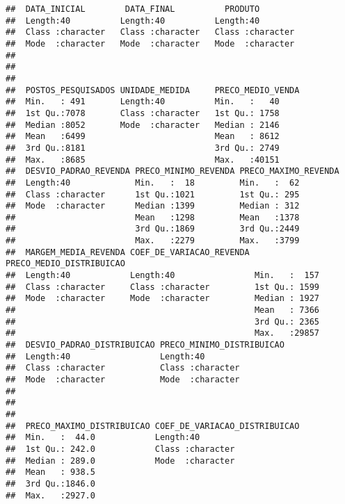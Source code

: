 \documentclass[]{article}
\begin{document}
\begin{verbatim}
##  DATA_INICIAL        DATA_FINAL          PRODUTO         
##  Length:40          Length:40          Length:40         
##  Class :character   Class :character   Class :character  
##  Mode  :character   Mode  :character   Mode  :character  
##                                                          
##                                                          
##                                                          
##  POSTOS_PESQUISADOS UNIDADE_MEDIDA     PRECO_MEDIO_VENDA
##  Min.   : 491       Length:40          Min.   :   40    
##  1st Qu.:7078       Class :character   1st Qu.: 1758    
##  Median :8052       Mode  :character   Median : 2146    
##  Mean   :6499                          Mean   : 8612    
##  3rd Qu.:8181                          3rd Qu.: 2749    
##  Max.   :8685                          Max.   :40151    
##  DESVIO_PADRAO_REVENDA PRECO_MINIMO_REVENDA PRECO_MAXIMO_REVENDA
##  Length:40             Min.   :  18         Min.   :  62        
##  Class :character      1st Qu.:1021         1st Qu.: 295        
##  Mode  :character      Median :1399         Median : 312        
##                        Mean   :1298         Mean   :1378        
##                        3rd Qu.:1869         3rd Qu.:2449        
##                        Max.   :2279         Max.   :3799        
##  MARGEM_MEDIA_REVENDA COEF_DE_VARIACAO_REVENDA PRECO_MEDIO_DISTRIBUICAO
##  Length:40            Length:40                Min.   :  157           
##  Class :character     Class :character         1st Qu.: 1599           
##  Mode  :character     Mode  :character         Median : 1927           
##                                                Mean   : 7366           
##                                                3rd Qu.: 2365           
##                                                Max.   :29857           
##  DESVIO_PADRAO_DISTRIBUICAO PRECO_MINIMO_DISTRIBUICAO
##  Length:40                  Length:40                
##  Class :character           Class :character         
##  Mode  :character           Mode  :character         
##                                                      
##                                                      
##                                                      
##  PRECO_MAXIMO_DISTRIBUICAO COEF_DE_VARIACAO_DISTRIBUICAO
##  Min.   :  44.0            Length:40                    
##  1st Qu.: 242.0            Class :character             
##  Median : 289.0            Mode  :character             
##  Mean   : 938.5                                         
##  3rd Qu.:1846.0                                         
##  Max.   :2927.0
\end{verbatim}
\end{document}
